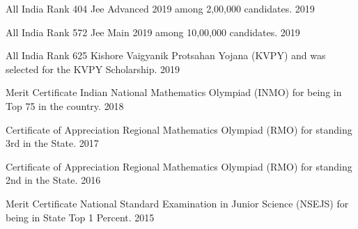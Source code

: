

\begin{cvhonors}

    \cvhonor
      {All India Rank 404} %
      {Jee Advanced 2019 among 2,00,000 candidates.} %
      {}
      {2019} %

    \cvhonor
      {All India Rank 572} %
      {Jee Main 2019 among 10,00,000 candidates.} %
      {}
      {2019} %

    \cvhonor
      {All India Rank 625} %
      {Kishore Vaigyanik Protsahan Yojana (KVPY) and was selected for the KVPY Scholarship.} %
      {}
      {2019} %

    \cvhonor
      {Merit Certificate} %
      {Indian National Mathematics Olympiad (INMO) for being in Top 75 in the country.} %
      {}
      {2018} %
      
    \cvhonor
      {Certificate of Appreciation} %
      {Regional Mathematics Olympiad (RMO) for standing 3rd in the State.} %
      {}
      {2017} %

    \cvhonor
      {Certificate of Appreciation} %
      {Regional Mathematics Olympiad (RMO) for standing 2nd in the State.} %
      {}
      {2016} %

    \cvhonor
      {Merit Certificate} %
      {National Standard Examination in Junior Science (NSEJS) for being in State Top 1 Percent.} %
      {} 
      {2015} %
    

\end{cvhonors}